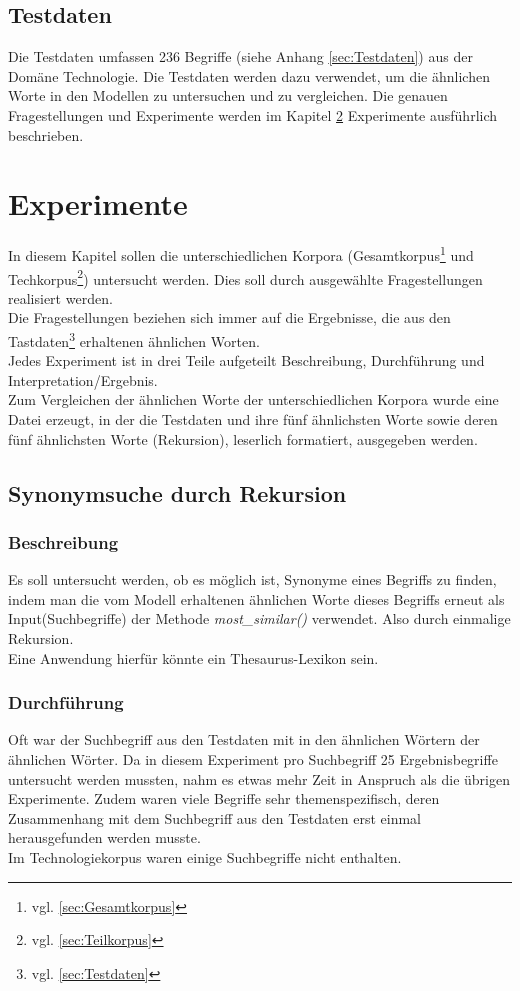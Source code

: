 \documentclass[12pt,a4paper]{report}
\begin{document}
	
	\section{Testdaten}
	Die Testdaten umfassen 236 Begriffe (siehe Anhang \ref{sec:Testdaten}) aus der Domäne Technologie. Die Testdaten werden dazu verwendet, um die ähnlichen Worte in den Modellen zu untersuchen und zu vergleichen. Die genauen Fragestellungen und Experimente werden im Kapitel \ref{chap:Experimente} Experimente ausführlich beschrieben.
	
	
\newpage
\chapter{Experimente}
\label{chap:Experimente}
In diesem Kapitel sollen die unterschiedlichen Korpora (Gesamtkorpus\footnote{vgl. \ref{sec:Gesamtkorpus}} und Techkorpus\footnote{vgl. \ref{sec:Teilkorpus}}) untersucht werden. Dies soll durch ausgewählte Fragestellungen realisiert werden.
\\Die Fragestellungen beziehen sich immer auf die Ergebnisse, die aus den Tastdaten\footnote{vgl. \ref{sec:Testdaten}} erhaltenen ähnlichen Worten.
\\Jedes Experiment ist in drei Teile aufgeteilt Beschreibung, Durchführung und Interpretation/Ergebnis.\\
Zum Vergleichen der ähnlichen Worte der unterschiedlichen Korpora wurde eine Datei erzeugt, in der die Testdaten und ihre fünf ähnlichsten Worte sowie deren fünf ähnlichsten Worte (Rekursion), leserlich formatiert, ausgegeben werden.\\ 

	\section{Synonymsuche durch Rekursion}
		\subsection{Beschreibung}
		Es soll untersucht werden, ob es möglich ist, Synonyme eines Begriffs zu finden, indem man die vom Modell erhaltenen ähnlichen Worte dieses Begriffs erneut als Input(Suchbegriffe) der Methode  \textit{most\_similar()} verwendet. Also durch einmalige Rekursion.\\
Eine Anwendung hierfür könnte ein Thesaurus-Lexikon sein.

		
		
		\subsection{Durchführung}
		Oft war der Suchbegriff aus den Testdaten mit in den ähnlichen Wörtern der ähnlichen Wörter. Da in diesem Experiment pro Suchbegriff 25 Ergebnisbegriffe untersucht werden mussten, nahm es etwas mehr Zeit in Anspruch als die übrigen Experimente. Zudem waren viele Begriffe sehr themenspezifisch, deren Zusammenhang mit dem Suchbegriff aus den Testdaten erst einmal herausgefunden werden musste.\\
		Im Technologiekorpus waren einige Suchbegriffe nicht enthalten.
	
\end{document}
